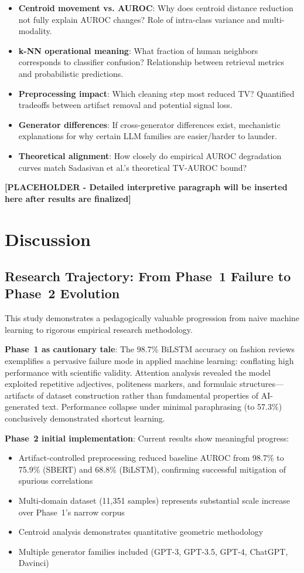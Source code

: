 \documentclass[conference]{IEEEtran}
\begin{document}
\begin{itemize}
    \item \textbf{Centroid movement vs. AUROC}: Why does centroid distance reduction not fully explain AUROC changes? Role of intra-class variance and multi-modality.
    \item \textbf{k-NN operational meaning}: What fraction of human neighbors corresponds to classifier confusion? Relationship between retrieval metrics and probabilistic predictions.
    \item \textbf{Preprocessing impact}: Which cleaning step most reduced TV? Quantified tradeoffs between artifact removal and potential signal loss.
    \item \textbf{Generator differences}: If cross-generator differences exist, mechanistic explanations for why certain LLM families are easier/harder to launder.
    \item \textbf{Theoretical alignment}: How closely do empirical AUROC degradation curves match Sadasivan et al.'s theoretical TV-AUROC bound?
\end{itemize}

\textbf{[PLACEHOLDER - Detailed interpretive paragraph will be inserted here after results are finalized]}

\section{Discussion}

\subsection{Research Trajectory: From Phase~1 Failure to Phase~2 Evolution}

This study demonstrates a pedagogically valuable progression from naive machine learning to rigorous empirical research methodology.

\textbf{Phase~1 as cautionary tale}: The 98.7\% BiLSTM accuracy on fashion reviews exemplifies a pervasive failure mode in applied machine learning: conflating high performance with scientific validity. Attention analysis revealed the model exploited repetitive adjectives, politeness markers, and formulaic structures—artifacts of dataset construction rather than fundamental properties of AI-generated text. Performance collapse under minimal paraphrasing (to 57.3\%) conclusively demonstrated shortcut learning.

\textbf{Phase~2 initial implementation}: Current results show meaningful progress:
\begin{itemize}
    \item Artifact-controlled preprocessing reduced baseline AUROC from 98.7\% to 75.9\% (SBERT) and 68.8\% (BiLSTM), confirming successful mitigation of spurious correlations
    \item Multi-domain dataset (11,351 samples) represents substantial scale increase over Phase~1's narrow corpus
    \item Centroid analysis demonstrates quantitative geometric methodology
    \item Multiple generator families included (GPT-3, GPT-3.5, GPT-4, ChatGPT, Davinci)
\end{itemize}
\end{document}
